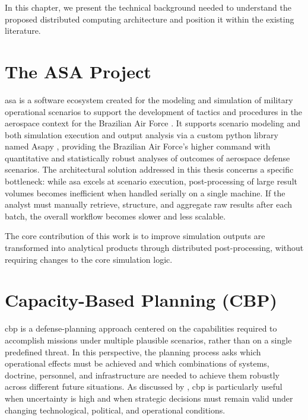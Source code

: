 In this chapter, we present the technical background needed to understand the proposed distributed computing architecture and position it within the existing literature.

\section{The ASA Project}
\label{sec:cap2-the-asa-project}

\gls{asa} is a software ecosystem created for the modeling and simulation of military operational scenarios to support the development of tactics and procedures in the aerospace context for the Brazilian Air Force \parencite{dantas2025asa}. It supports scenario modeling and both simulation execution and output analysis via a custom python library named Asapy \parencite{dantas2024asapy}, providing the Brazilian Air Force's higher command with quantitative and statistically robust analyses of outcomes of aerospace defense scenarios. The architectural solution addressed in this thesis concerns a specific bottleneck: while \gls{asa} excels at scenario execution, post-processing of large result volumes becomes inefficient when handled serially on a single machine. If the analyst must manually retrieve, structure, and aggregate raw results after each batch, the overall workflow becomes slower and less scalable.

The core contribution of this work is to improve simulation outputs are transformed into analytical products through distributed post-processing, without requiring changes to the core simulation logic. 

\section{Capacity-Based Planning (CBP)}
\label{sec:cap2-capacity-based-planning-cbp}

\gls{cbp} is a defense-planning approach centered on the capabilities required to accomplish missions under multiple plausible scenarios, rather than on a single predefined threat. In this perspective, the planning process asks which operational effects must be achieved and which combinations of systems, doctrine, personnel, and infrastructure are needed to achieve them robustly across different future situations. As discussed by \textcite{davis2002cbp}, \gls{cbp} is particularly useful when uncertainty is high and when strategic decisions must remain valid under changing technological, political, and operational conditions.


